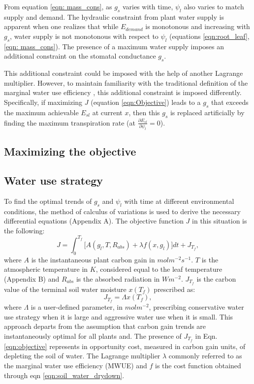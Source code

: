 \documentclass[utf8]{frontiersSCNS} %
\begin{document}
From equation \ref{eqn: mass_cons}, as $g_s$ varies with time, $\psi_l$ also varies to match supply and demand. The hydraulic constraint from plant water supply is apparent when one realizes that while $E_{demand}$ is monotonous and increasing with $g_s$, water supply is not monotonous with respect to $\psi_l$ (equations \ref{eqn:root_leaf}, \ref{eqn: mass_cons}). The presence of a maximum water supply imposes an additional constraint on the stomatal conductance $g_s$. 

This additional constraint could be imposed with the help of another Lagrange multiplier. However, to maintain familiarity with the traditional definition of the marginal water use efficiency \citep{cowan1977}, this additional constraint is imposed differently. Specifically, if maximizing $J$ (equation \ref{eqn:Objective}) leads to a $g_s$ that exceeds the maximum achievable $E_{sl}$ at current $x$, then this $g_s$ is replaced artificially by finding the maximum transpiration rate \Big(at $\frac{\partial E_{sl}}{\partial \psi_l} = 0$\Big). 
\subsection{Maximizing the objective}


\subsection{Water use strategy}

To find the optimal trends of $g_s$ and $\psi_l$ with time at different environmental conditions, the method of calculus of variations is used to derive the necessary differential equations (Appendix A). The objective function $J$ in this situation is the following:
\begin{equation}
    \label{eqn:objective}
    J = \int_0^{T_f}\big[ A(g_l,T,R_{abs}) + \lambda f(x,g_l)\big] dt + J_{T_f},
\end{equation}
where $A$ is the instantaneous plant carbon gain in $molm^{-2}s^{-1}$. $T$ is the atmospheric temperature in $K$, considered equal to the leaf temperature (Appendix B) and $R_{abs}$ is the absorbed radiation in $Wm^{-2}$. $J_{T_f}$ is the carbon value of the terminal soil water moisture $x(T_f)$ prescribed as:
\begin{equation}
    \label{eqn:terminal_gain}
    J_{T_f} = \Lambda x(T_f),
\end{equation}
where $\Lambda$ is a user-defined parameter, in $mol m^{-2}$, prescribing conservative water use strategy when it is large and aggressive water use when it is small. This approach departs from the assumption that carbon gain trends are instantaneously optimal for all plants and. The presence of $J_{T_f}$ in Eqn. \ref{eqn:objective} represents in opportunity cost, measured in carbon gain units, of depleting the soil of water. The Lagrange multiplier $\lambda$ commonly referred to as the marginal water use efficiency (MWUE) and $f$ is the cost function obtained through eqn \ref{eqn:soil_water_drydown}.
\end{document}
